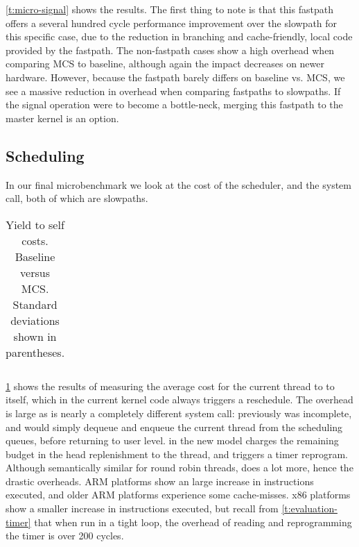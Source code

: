 \cref{t:micro-signal} shows the results. The first thing to note is that this fastpath offers a
several hundred cycle performance improvement over the slowpath for this specific case, due to the 
reduction in branching and cache-friendly, local code provided by the fastpath. 
The non-fastpath cases show a high overhead when comparing MCS to baseline, although again the
impact decreases on newer hardware. However, because the fastpath barely differs on baseline vs.
MCS, we see a massive reduction in overhead when comparing fastpaths to slowpaths. If the signal
operation were to become a bottle-neck, merging this fastpath to the master kernel is an option.  
\clearpage

\subsection{Scheduling}

In our final microbenchmark we look at the cost of the scheduler, and the \yield system call, both
of which are slowpaths.

\begin{table}[t]\centering
    \begin{tabularx}{\textwidth}{Xlllllll}\toprule

\end{tabularx}
\caption[Yield to self scheduler costs.]{Yield to self costs. Baseline \selfour  versus MCS. Standard deviations shown in parentheses.}
\label{t:micro-yield}
\end{table}

\cref{t:micro-yield} shows the results of measuring the average cost for the current thread to
\yield to itself, which in the current kernel code always triggers a reschedule. The overhead is large 
as \yield is nearly a completely different system call: previously \yield was incomplete, and would simply
dequeue and enqueue the current thread from the scheduling queues, before returning to user level.
\yield in the new model charges the remaining budget in the head replenishment to the thread, and
triggers a timer reprogram. Although semantically similar for round robin threads, \yield does a lot
more, hence the drastic overheads. ARM platforms show an large increase in instructions executed,
and older ARM platforms experience some cache-misses. x86 platforms show a smaller increase in
instructions executed, but recall from \cref{t:evaluation-timer} that when run in a tight loop, the
overhead of reading and reprogramming the timer is over 200 cycles. 

